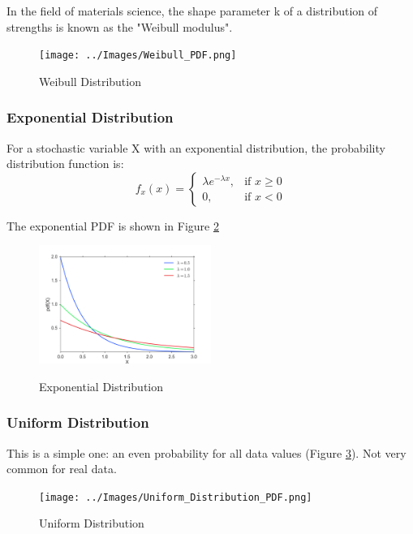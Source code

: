 In the field of materials science, the shape parameter k of a distribution of strengths is known as the "Weibull modulus".

\begin{figure}
  \centering
  \texttt{[image: ../Images/Weibull\_PDF.png]}\\
  \caption{Weibull Distribution}\label{fig:weibull}
\end{figure}


\subsubsection{Exponential Distribution}

For a stochastic variable X with an exponential distribution, the probability distribution function is:
\begin{equation}\label{eq_exponential}
f_x (x) =
  \begin{cases}
\lambda e^{- \lambda x}, & \mbox{if } x \ge 0 \\
0, & \mbox{if } x < 0
\end{cases}
\end{equation}

The exponential PDF is shown in Figure \ref{fig:exponential}
\begin{figure}
  \centering
  \includegraphics[width=0.5\textwidth]{../Images/dist_exp.png}\\
  \caption{Exponential Distribution}\label{fig:exponential}
\end{figure}


\subsubsection{Uniform Distribution}

This is a simple one: an even probability for all data values (Figure \ref{fig:uniform}). Not very common for real data.

\begin{figure}
  \centering
  \texttt{[image: ../Images/Uniform\_Distribution\_PDF.png]}\\
  \caption{Uniform Distribution} \label{fig:uniform}
\end{figure}

